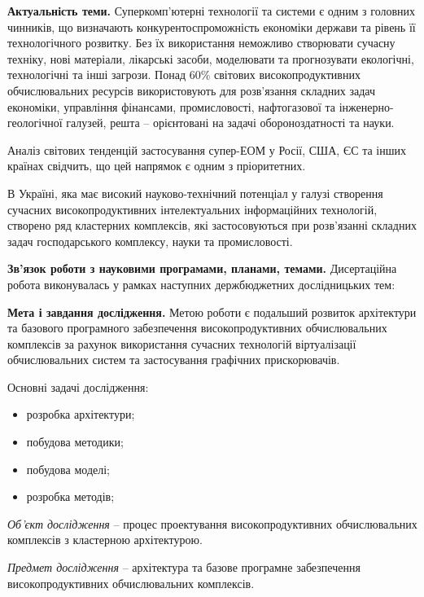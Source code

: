 \textbf{Актуальність теми.} 
Суперкомп’ютерні технології та системи є одним з головних чинників, що визначають конкурентоспроможність економіки держави та рівень її технологічного розвитку. Без їх використання неможливо створювати сучасну техніку, нові матеріали, лікарські засоби, моделювати та прогнозувати екологічні, технологічні та інші загрози. Понад 60\% світових високопродуктивних обчислювальних ресурсів використовують для розв’язання складних задач економіки, управління фінансами, промисловості, нафтогазової та інженерно-геологічної галузей, решта -- орієнтовані на задачі обороноздатності та науки.

Аналіз світових тенденцій застосування супер-ЕОМ у Росії, США, ЄС та інших країнах свідчить, що цей напрямок є одним з пріоритетних. 

В Україні, яка має високий науково-технічний потенціал у галузі створення сучасних високопродуктивних інтелектуальних інформаційних технологій, створено ряд кластерних комплексів, які застосовуються при розв'язанні складних задач господарського комплексу, науки та промисловості.


\textbf{Зв'язок роботи з науковими програмами, планами, темами.}
Дисертаційна робота виконувалась у рамках наступних держбюджетних дослідницьких тем:



\textbf{Мета і завдання дослідження.}
Метою роботи є подальший розвиток архітектури та базового програмного забезпечення високопродуктивних обчислювальних комплексів за рахунок використання сучасних технологій віртуалізації обчислювальних систем та  застосування графічних прискорювачів.

Основні задачі дослідження:
\begin{itemize}
 \item розробка архітектури;
 \item побудова методики;
 \item побудова моделі;
 \item розробка методів;
 \end{itemize}


\textit{Об'єкт дослідження} -- процес проектування високопродуктивних обчислювальних комплексів з кластерною архітектурою.

\textit{Предмет дослідження} -- архітектура та базове програмне забезпечення високопродуктивних обчислювальних комплексів.

